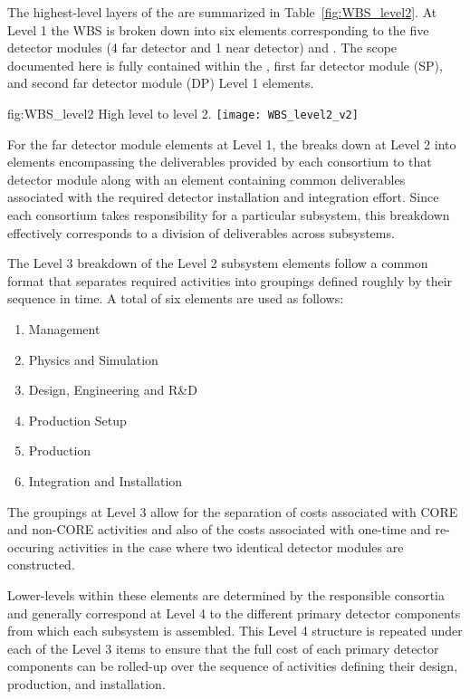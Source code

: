 The highest-level layers of the   are summarized 
in Table~\ref{fig:WBS_level2}.  At Level 1 the WBS is broken down into 
six elements corresponding to the five  detector modules (4 
far detector and 1 near detector) and .  The scope documented
here is fully contained within the , first far detector module 
(SP), and second far detector module (DP) Level 1 elements.   
\begin{dunefigure}{fig:WBS_level2}
  {High level   to level 2.}
  \texttt{[image: WBS\_level2\_v2]}
\end{dunefigure}

For the far detector module elements at Level 1, the  breaks 
down at Level 2 into elements encompassing the deliverables provided by 
each consortium to that detector module along with an element containing 
common deliverables associated with the required detector installation 
and integration effort.  Since each consortium takes responsibility 
for a particular subsystem, this breakdown effectively corresponds to 
a division of deliverables across subsystems. 

The Level 3 breakdown of the Level 2 subsystem  elements follow 
a common format that separates required activities into groupings defined 
roughly by their sequence in time.  A total of six elements are used as 
follows:     
\begin{enumerate}
  \item Management
  \item Physics and Simulation
  \item Design, Engineering and R\&D
  \item Production Setup
  \item Production
  \item Integration and Installation
\end{enumerate}
The groupings at Level 3 allow for the separation of costs associated with 
CORE and non-CORE activities and also of the costs associated with one-time 
and re-occuring activities in the case where two identical detector modules
are constructed.   

Lower-levels within these  elements are determined by 
the responsible consortia and generally correspond at Level 4 to 
the different primary detector components from which each subsystem
is assembled.  This Level 4 structure is repeated under each of the 
Level 3 items to ensure that the full cost of each primary detector 
components can be rolled-up over the sequence of activities defining 
their design, production, and installation.       

